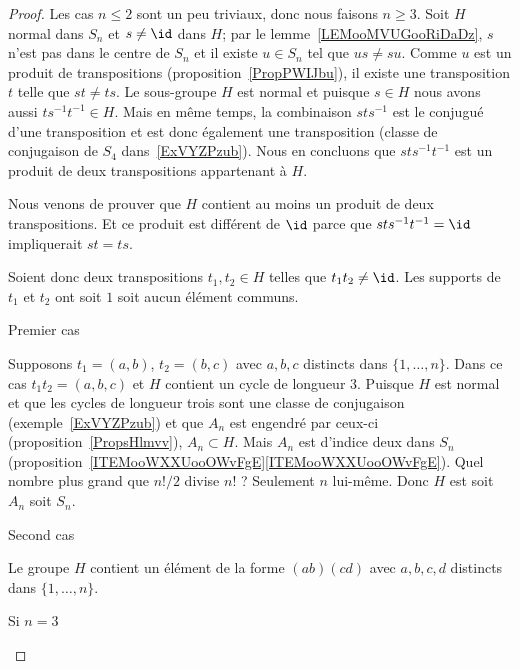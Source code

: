\begin{proof}
	Les cas \( n\leq 2\) sont un peu triviaux, donc nous faisons \( n\geq 3\). Soit \( H\) normal dans \( S_n\) et \( s\neq \id\) dans \( H\); par le lemme~\ref{LEMooMVUGooRiDaDz}, \( s\) n'est pas dans le centre de \( S_n\) et il existe \( u\in S_n\) tel que \( us\neq su\). Comme \( u\) est un produit de transpositions (proposition~\ref{PropPWIJbu}), il existe une transposition \( t\) telle que \( st\neq ts\). Le sous-groupe \( H\) est normal et puisque \( s\in H\) nous avons aussi \( ts^{-1}t^{-1}\in H\). Mais en même temps, la combinaison \( sts^{-1}\) est le conjugué d'une transposition et est donc également une transposition (classe de conjugaison de \( S_4\) dans~\ref{ExVYZPzub}). Nous en concluons que \( sts^{-1}t^{-1}\) est un produit de deux transpositions appartenant à \( H\).

	Nous venons de prouver que \( H\) contient au moins un produit de deux transpositions. Et ce produit est différent de \( \id\) parce que \( sts^{-1}t^{-1}=\id\) impliquerait \( st=ts\).

	Soient donc deux transpositions \( t_1,t_2\in H\) telles que \( t_1t_2\neq \id\). Les supports de \( t_1\) et \( t_2\) ont soit \( 1\) soit aucun élément communs.

	\begin{subproof}
		\item[Premier cas]

		Supposons \( t_1=(a,b)\), \( t_2=(b,c)\) avec \( a,b,c\) distincts dans \( \{ 1,\ldots, n \}\). Dans ce cas \( t_1t_2=(a,b,c)\) et \( H\) contient un cycle de longueur \( 3\). Puisque \( H\) est normal et que les cycles de longueur trois sont une classe de conjugaison (exemple~\ref{ExVYZPzub}) et que \( A_n\) est engendré par ceux-ci (proposition~\ref{PropsHlmvv}), \( A_n\subset H\). Mais \( A_n\) est d'indice deux dans \( S_n\) (proposition~\ref{ITEMooWXXUooOWvFgE}\ref{ITEMooWXXUooOWvFgE}). Quel nombre plus grand que \( n!/2\) divise \( n!\) ? Seulement \( n\) lui-même. Donc \( H\) est soit \( A_n\) soit \( S_n\).

		\item[Second cas]

		Le groupe \( H\) contient un élément de la forme \( (ab)(cd)\) avec \( a,b,c,d\) distincts dans \( \{ 1,\ldots, n \}\).

		\begin{subproof}

			\item[Si \( n=3\)]


\end{subproof}
\end{subproof}
\end{proof}
